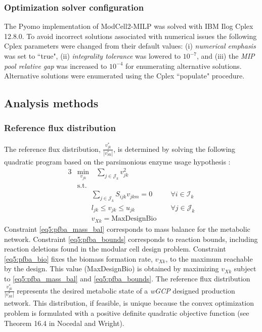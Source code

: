 \subsubsection{Optimization solver configuration} \label{sec:solver}
 The Pyomo \citep{hart2017} implementation of ModCell2-MILP was solved with IBM Ilog Cplex 12.8.0. To avoid incorrect solutions associated with numerical issues the following Cplex parameters were changed from their default values: (i) \textit{numerical emphasis} was set to ``true", (ii) \textit{integrality tolerance} was lowered to $10^{-7}$, and (iii) the \textit{MIP pool relative gap} was increased to $10^{-4}$ for enumerating alternative solutions.  Alternative solutions were enumerated using the Cplex ``populate" procedure.


\subsection{Analysis methods}
\subsubsection{Reference flux distribution} \label{sec:flux}
The reference flux distribution, $\frac{v_{jk}^*}{|v_{Sk}^*|}$, is determined by solving the following quadratic program based on the parsimonious enzyme usage hypothesis \citep{machado2014, lewis2010}:
\begin{alignat}{3}
    & \underset{v_{jk}}{\text{min}} \label{eq5:pfba_obj}
\quad \sum_{j \in \mathcal{J}_k} v_{jk}^2 \\
\nonumber & \text{s.t. }  \qquad \\
	& \qquad 	\sum_{j\in \mathcal{J}_k} S_{ijk} v_{jkm} =0  \quad && \forall i\in \mathcal{I}_k 		\label{eq5:pfba_mass_bal}\\
	& \qquad  l_{jk}  \le v_{jk} \le u_{jk} \;  && \forall j\in \mathcal{J}_k 			\label{eq5:pfba_bounds}\\
	& \qquad  v_{Xk} = \text{MaxDesignBio} 			\label{eq5:pfba_bio}
\end{alignat}
\noindent  Constraint \eqref{eq5:pfba_mass_bal} corresponds to mass balance for the metabolic network.
Constraint \eqref{eq5:pfba_bounds} corresponds to reaction bounds, including reaction deletions found in the modular cell design problem.
Constraint \eqref{eq5:pfba_bio} fixes the biomass formation rate, $v_{Xk}$, to the maximum reachable by the design.
This value (MaxDesignBio) is obtained by maximizing $v_{Xk}$ subject to \eqref{eq5:pfba_mass_bal} and \eqref{eq5:pfba_bounds}.
The reference flux distribution $\frac{v_{jk}^*}{|v_{Sk}^*|}$ represents the desired metabolic state of a \textit{wGCP} designed production network. This distribution, if feasible, is unique because the convex optimization problem is formulated with a positive definite quadratic objective function (see Theorem 16.4 in Nocedal and Wright\citep{nocedal2006}). %


